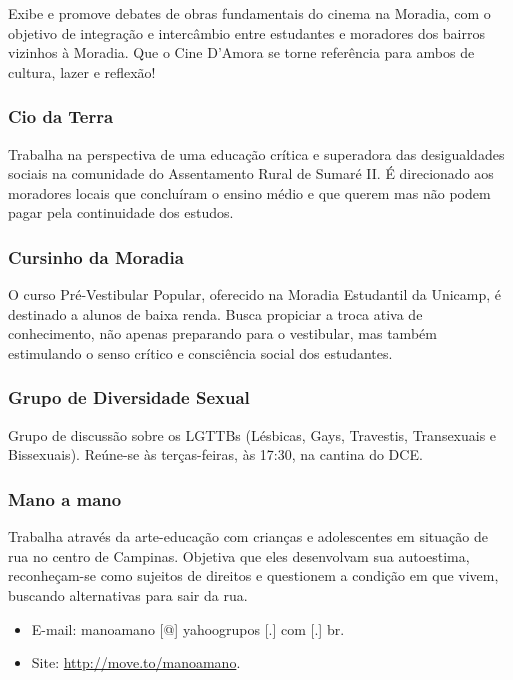 Exibe e promove debates de obras fundamentais do cinema na Moradia, com
o objetivo de integração e intercâmbio entre estudantes e moradores dos bairros
vizinhos à Moradia. Que o Cine D'Amora se torne referência para ambos de
cultura, lazer e reflexão!

\subsubsection{Cio da Terra}

Trabalha na perspectiva de uma educação crítica e superadora das desigualdades
sociais na comunidade do Assentamento Rural de Sumaré II. É direcionado aos
moradores locais que concluíram o ensino médio e que querem mas não podem pagar
pela continuidade dos estudos.

\subsubsection{Cursinho da Moradia}

O curso Pré-Vestibular Popular, oferecido na Moradia Estudantil da
Unicamp, é destinado a alunos de baixa renda. Busca propiciar a troca
ativa de conhecimento, não apenas preparando para o vestibular, mas
também estimulando o senso crítico e consciência social dos
estudantes.

\subsubsection{Grupo de Diversidade Sexual}

Grupo de discussão sobre os LGTTBs (Lésbicas, Gays, Travestis, Transexuais
e Bissexuais). Reúne-se às terças-feiras, às 17:30, na cantina do DCE.

\subsubsection{Mano a mano}

Trabalha através da arte-educação com crianças e adolescentes em situação de rua
no centro de Campinas. Objetiva que eles desenvolvam sua autoestima,
reconheçam-se como sujeitos de direitos e questionem a condição em que vivem,
buscando alternativas para sair da rua.

\begin{itemize}
\item  E-mail: manoamano [@] yahoogrupos [.] com [.] br.
\item  Site: \url{http://move.to/manoamano}.
\end{itemize}

